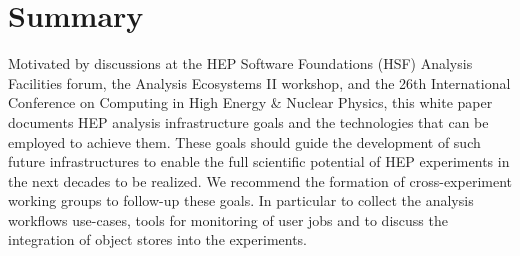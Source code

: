 \documentclass{article}
\begin{document}
\clearpage

\tableofcontents











\section{Summary}

Motivated by discussions at the HEP Software Foundations (HSF) Analysis Facilities forum, the Analysis Ecosystems II workshop, and the 26th International Conference on Computing in High Energy \& Nuclear Physics, this white paper documents HEP analysis infrastructure goals and the technologies that can be employed to achieve them. These goals should guide the development of such future infrastructures to enable the full scientific potential of HEP experiments in the next decades to be realized. We recommend the formation of cross-experiment working groups to follow-up these goals. In particular to collect the analysis workflows use-cases, tools for monitoring of user jobs and to discuss the integration of object stores into the experiments. 










\sloppy
\raggedright
\printbibliography[title={References},heading=bibintoc]

\clearpage
\end{document}
